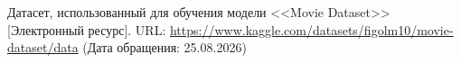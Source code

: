  \par

\begin{thebibliography}{}
     Датасет, использованный для обучения модели <<Movie Dataset>> [Электронный ресурс]. URL: \href{https://www.kaggle.com/datasets/figolm10/movie-dataset/data}{https://www.kaggle.com/datasets/figolm10/movie-dataset/data} (Дата обращения: 25.08.2026)
\end{thebibliography}
\newpage